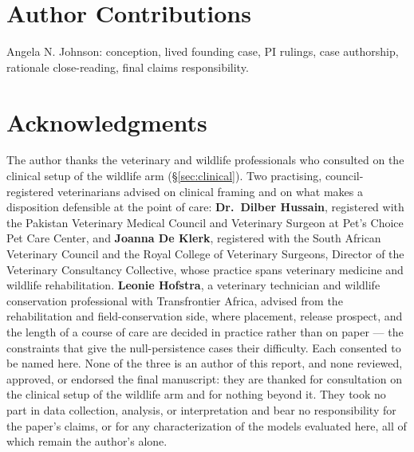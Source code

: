 \documentclass[10pt]{article}
\begin{document}
\section*{Author Contributions}
Angela N. Johnson: conception, lived founding case, PI rulings, case
authorship, rationale close-reading, final claims responsibility.

\section*{Acknowledgments}
The author thanks the veterinary and wildlife professionals who consulted
on the clinical setup of the wildlife arm (\S\ref{sec:clinical}). Two
practising, council-registered veterinarians advised on clinical framing
and on what makes a disposition defensible at the point of care:
\textbf{Dr.\ Dilber Hussain}, registered with the Pakistan Veterinary
Medical Council and Veterinary Surgeon at Pet's Choice Pet Care Center, and
\textbf{Joanna De Klerk}, registered with the South African Veterinary
Council and the Royal College of Veterinary Surgeons, Director of the
Veterinary Consultancy Collective, whose practice spans veterinary medicine
and wildlife rehabilitation. \textbf{Leonie Hofstra}, a veterinary
technician and wildlife conservation professional with Transfrontier
Africa, advised from the rehabilitation and field-conservation side, where
placement, release prospect, and the length of a course of care are decided
in practice rather than on paper --- the constraints that give the
null-persistence cases their difficulty. Each consented to
be named here. None of the three is an author of this report, and none
reviewed, approved, or endorsed the final manuscript: they are thanked for
consultation on the clinical setup of the wildlife arm and for nothing
beyond it. They took no part in data collection, analysis, or interpretation
and bear no responsibility for the paper's claims, or for any
characterization of the models evaluated here, all of which remain the
author's alone.
\end{document}
